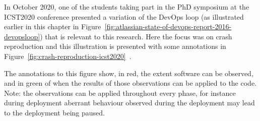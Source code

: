 In October 2020, one of the students taking part in the PhD symposium at the ICST2020 conference presented a variation of the DevOps loop (as illustrated earlier in this chapter in Figure~\ref{fig:atlassian-state-of-devops-report-2016-devopsloop}) that is relevant to this research. Here the focus was on crash reproduction and this illustration is presented with some annotations in Figure~\ref{fig:crash-reproduction-icst2020}~. %

The annotations to this figure show, in red, the extent software can be observed, and in green of when the results of those observations can be applied to the code. Note: the observations can be applied throughout every phase, for instance during deployment aberrant behaviour observed during the deployment may lead to the deployment being paused.

